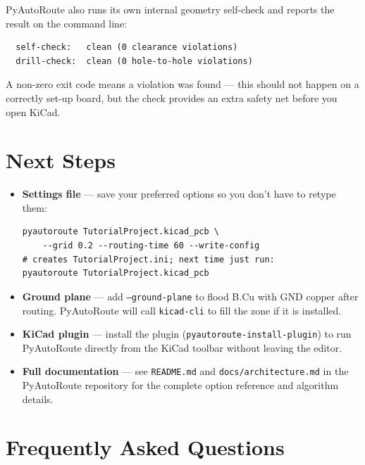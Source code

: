 \documentclass[11pt,a4paper]{article}
\begin{document}
PyAutoRoute also runs its own internal geometry self-check and reports
the result on the command line:

\begin{lstlisting}
  self-check:   clean (0 clearance violations)
  drill-check:  clean (0 hole-to-hole violations)
\end{lstlisting}

A non-zero exit code means a violation was found --- this should not
happen on a correctly set-up board, but the check provides an extra
safety net before you open KiCad.

\section{Next Steps}

\begin{itemize}
    \item \textbf{Settings file} --- save your preferred options so
          you don't have to retype them:
\begin{lstlisting}
pyautoroute TutorialProject.kicad_pcb \
    --grid 0.2 --routing-time 60 --write-config
# creates TutorialProject.ini; next time just run:
pyautoroute TutorialProject.kicad_pcb
\end{lstlisting}
    \item \textbf{Ground plane} --- add \texttt{--ground-plane} to
          flood B.Cu with GND copper after routing. PyAutoRoute will
          call \texttt{kicad-cli} to fill the zone if it is installed.
    \item \textbf{KiCad plugin} --- install the plugin
          (\texttt{pyautoroute-install-plugin}) to run PyAutoRoute
          directly from the KiCad toolbar without leaving the editor.
    \item \textbf{Full documentation} --- see \texttt{README.md} and
          \texttt{docs/architecture.md} in the PyAutoRoute repository
          for the complete option reference and algorithm details.
\end{itemize}

\section{Frequently Asked Questions}

\end{document}
